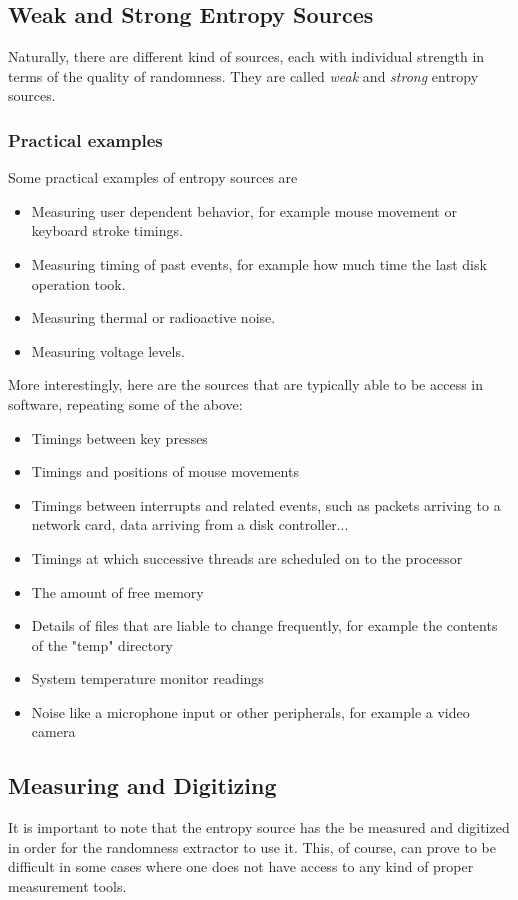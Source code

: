 \subsection{Weak and Strong Entropy Sources}
Naturally, there are different kind of sources, each with individual strength in terms of the quality of randomness.
They are called \emph{weak} and \emph{strong} entropy sources.

\subsubsection{Practical examples}
Some practical examples of entropy sources are 

\begin{itemize}
    \item Measuring user dependent behavior, for example mouse movement or keyboard stroke timings.
    \item Measuring timing of past events, for example how much time the last disk operation took.
    \item Measuring thermal or radioactive noise.
    \item Measuring voltage levels.
\end{itemize}

\noindent
More interestingly, here are the sources that are typically able to be access in software, repeating some of the above:

\begin{itemize}
    \item Timings between key presses
    \item Timings and positions of mouse movements
    \item Timings between interrupts and related events, such as packets arriving to a network card, data arriving from a disk controller...
    \item Timings at which successive threads are scheduled on to the processor
    \item The amount of free memory
    \item Details of files that are liable to change frequently, for example the contents of the "temp" directory
    \item System temperature monitor readings
    \item Noise like a microphone input or other peripherals, for example a video camera
\end{itemize}
\subsection{Measuring and Digitizing}
It is important to note that the entropy source has the be measured and digitized in order for the randomness extractor to use it.
This, of course, can prove to be difficult in some cases where one does not have access to any kind of proper measurement tools.

